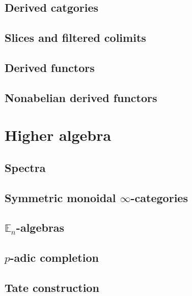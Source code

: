 \documentclass[10pt]{amsart}
\theoremstyle{definition}
\theoremstyle{remark}
\theoremstyle{plain}
\theoremstyle{definition}
\theoremstyle{remark}
\newcommand{\E}{\mathbb{E}}
\newcommand{\1}{\mathbf{1}}
\newcommand{\2}{\mathbf{2}}
\newcommand{\3}{\mathbf{3}}
\begin{document}
\subsection{Derived catgories}%
\label{sub:Derived catgories}

\subsection{Slices and filtered colimits}%
\label{sub:Slices and filtered colimits}

\subsection{Derived functors}%
\label{sub:Derived functors}

\subsection{Nonabelian derived functors}%
\label{sub:Nonabelian derived functors}


\section{Higher algebra}%
\label{sec:Higher algebra}

\subsection{Spectra}%
\label{sub:Spectra}

\subsection{Symmetric monoidal $\infty$-categories}%
\label{sub:Symmetric monoidal infinity-categories}

\subsection{$\E_n$-algebras}%
\label{sub:En-algebras}

\subsection{$p$-adic completion}%
\label{sub:p-adic completion}

\subsection{Tate construction}%
\label{sub:Tate construction}
\end{document}
